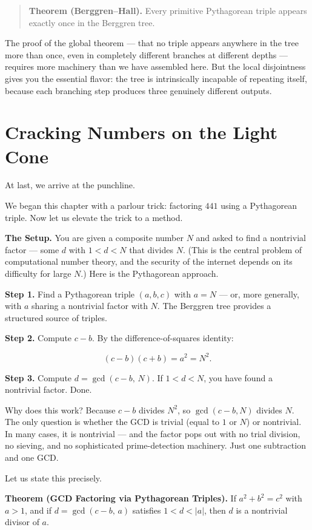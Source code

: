 \documentclass[11pt,twoside,openright]{book}
\theoremstyle{definition}
\theoremstyle{remark}
\begin{document}
\begin{quote}
\textbf{Theorem (Berggren--Hall).} Every primitive Pythagorean triple appears exactly once in the Berggren tree.
\end{quote}
The proof of the global theorem --- that no triple appears anywhere in the tree more than once, even in completely different branches at different depths --- requires more machinery than we have assembled here. But the local disjointness gives you the essential flavor: the tree is intrinsically incapable of repeating itself, because each branching step produces three genuinely different outputs.



\section{Cracking Numbers on the Light Cone}

At last, we arrive at the punchline.

We began this chapter with a parlour trick: factoring $441$ using a Pythagorean triple. Now let us elevate the trick to a method.

\textbf{The Setup.} You are given a composite number $N$ and asked to find a nontrivial factor --- some $d$ with $1 < d < N$ that divides $N$. (This is the central problem of computational number theory, and the security of the internet depends on its difficulty for large $N$.) Here is the Pythagorean approach.

\textbf{Step 1.} Find a Pythagorean triple $(a, b, c)$ with $a = N$ --- or, more generally, with $a$ sharing a nontrivial factor with $N$. The Berggren tree provides a structured source of triples.

\textbf{Step 2.} Compute $c - b$. By the difference-of-squares identity:

\[(c - b)(c + b) = a^2 = N^2.\]

\textbf{Step 3.} Compute $d = \gcd(c - b, \, N)$. If $1 < d < N$, you have found a nontrivial factor. Done.

Why does this work? Because $c - b$ divides $N^2$, so $\gcd(c - b, N)$ divides $N$. The only question is whether the GCD is trivial (equal to $1$ or $N$) or nontrivial. In many cases, it is nontrivial --- and the factor pops out with no trial division, no sieving, and no sophisticated prime-detection machinery. Just one subtraction and one GCD.

Let us state this precisely.

\textbf{Theorem (GCD Factoring via Pythagorean Triples).} If $a^2 + b^2 = c^2$ with $a > 1$, and if $d = \gcd(c - b, \, a)$ satisfies $1 < d < |a|$, then $d$ is a nontrivial divisor of $a$.
\end{document}
